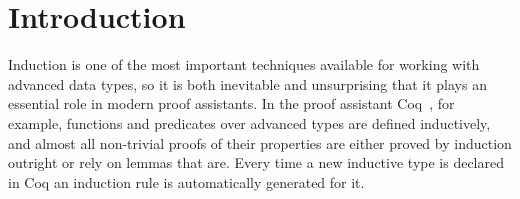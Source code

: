\documentclass[sigplan,screen]{acmart}
\begin{document}
\maketitle


\section{Introduction}\label{sec:intro}

Induction is one of the most important techniques available for
working with advanced data types, so it is both inevitable and
unsurprising that it plays an essential role in modern proof
assistants. In the proof assistant Coq~\cite{coq20}, for example,
functions and predicates over advanced types are defined inductively,
and almost all non-trivial proofs of their properties are either
proved by induction outright or rely on lemmas that are.  Every time a
new inductive type is declared in Coq an induction rule is
automatically generated for it.
\end{document}
